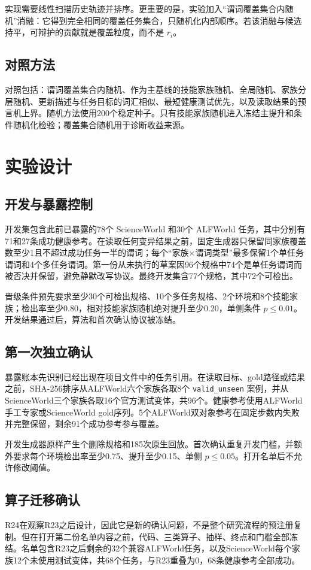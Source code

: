 \documentclass[10pt]{article}
\begin{document}
实现需要线性扫描历史轨迹并排序。更重要的是，实验加入“谓词覆盖集合内随机”消融：它得到完全相同的覆盖任务集合，只随机化内部顺序。若该消融与候选持平，可辩护的贡献就是覆盖粒度，而不是 $r_i$。

\subsection{对照方法}
对照包括：谓词覆盖集合内随机、作为主基线的技能家族随机、全局随机、家族分层随机、更新描述与任务目标的词汇相似、最短健康测试优先，以及读取结果的预言机上界。随机方法使用200个稳定种子。只有技能家族随机进入冻结主提升和条件随机化检验；覆盖集合随机用于诊断收益来源。

\section{实验设计}
\subsection{开发与暴露控制}
开发集包含此前已暴露的78个 ScienceWorld 和30个 ALFWorld 任务，其中分别有71和27条成功健康参考。在读取任何变异结果之前，固定生成器只保留同家族覆盖数至少1且不超过成功任务一半的谓词；每个“家族×谓词类型”最多保留1个单任务谓词和4个多任务谓词。第一份从未执行的草案因96个规格中74个是单任务谓词而被否决并保留，避免静默改写协议。最终开发集含77个规格，其中72个可检出。

晋级条件预先要求至少30个可检出规格、10个多任务规格、2个环境和8个技能家族；检出率至少0.80，相对技能家族随机绝对提升至少0.20，单侧条件 $p\leq0.01$。开发结果通过后，算法和首次确认协议被冻结。

\subsection{第一次独立确认}
暴露账本先识别已经出现在项目文件中的任务引用。在读取目标、gold路径或结果之前，SHA-256排序从ALFWorld六个家族各取8个 \texttt{valid\_unseen} 案例，并从ScienceWorld三个家族各取16个官方测试变体，共96个。健康参考使用ALFWorld手工专家或ScienceWorld gold序列。5个ALFWorld双对象参考在固定步数内失败并完整保留，剩余91个成功参考参与覆盖。

开发生成器原样产生\RXXIIISpecs{}个删除规格和185次原生回放。首次确认重复开发门槛，并额外要求每个环境检出率至少0.75、提升至少0.15、单侧 $p\leq0.05$。打开名单后不允许修改阈值。

\subsection{算子迁移确认}
R24在观察R23之后设计，因此它是新的确认问题，不是整个研究流程的预注册复制。但在打开第二份名单内容之前，代码、三类算子、抽样、终点和门槛全部冻结。名单包含R23之后剩余的32个兼容ALFWorld任务，以及ScienceWorld每个家族12个未使用测试变体，共68个任务，与R23重叠为0，68条健康参考全部成功。
\end{document}

